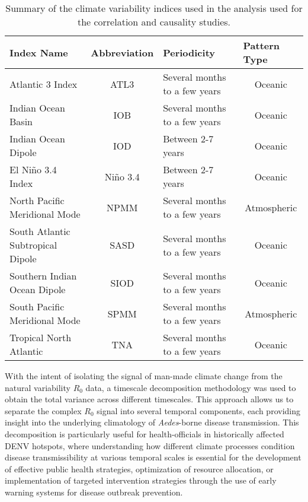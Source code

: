 \documentclass[10pt,twocolumn]{wlscirep}
\begin{document}
\begin{table*}[t]
  \centering
  \begin{tabular}{l|c|l|c}
    \textbf{Index Name}               & \multicolumn{1}{l|}{\textbf{Abbreviation}} & \textbf{Periodicity}          & \multicolumn{1}{l|}{\textbf{Pattern Type}} \\ \hline
    Atlantic 3 Index                  & ATL3                                       & Several months to a few years & Oceanic                                    \\
    Indian Ocean Basin                & IOB                                        & Several months to a few years & Oceanic                                    \\
    Indian Ocean Dipole               & IOD                                        & Between 2-7 years             & Oceanic                                    \\
    El Niño 3.4 Index                 & Niño 3.4                                   & Between 2-7 years             & Oceanic                                    \\
    North Pacific Meridional Mode     & NPMM                                       & Several months to a few years & Atmospheric                                \\
    South Atlantic Subtropical Dipole & SASD                                       & Several months to a few years & Oceanic                                    \\
    Southern Indian Ocean Dipole      & SIOD                                       & Several months to a few years & Oceanic                                    \\
    South Pacific Meridional Mode     & SPMM                                       & Several months to a few years & Atmospheric                                \\
    Tropical North Atlantic           & TNA                                        & Several months to a few years & Oceanic
  \end{tabular}%
  \caption{Summary of the climate variability indices used in the analysis used for the correlation and causality studies.}
  \label{tab:climate-variability-indices}
\end{table*}
With the intent of isolating the signal of man-made climate change from the natural variability $R_0$ data, a timescale decomposition methodology was used to obtain the total variance across different timescales. This approach allows us to separate the complex $R_0$ signal into several temporal components, each providing insight into the underlying climatology of \textit{Aedes}-borne disease transmission. This decomposition is particularly useful for health-officials in historically affected DENV hotspots, where understanding how different climate processes condition disease transmissibility at various temporal scales is essential for the development of effective public health strategies, optimization of resource allocation, or implementation of targeted intervention strategies through the use of early warning systems for disease outbreak prevention\cite{thomson_2018a, munoz_2016}.
\end{document}
